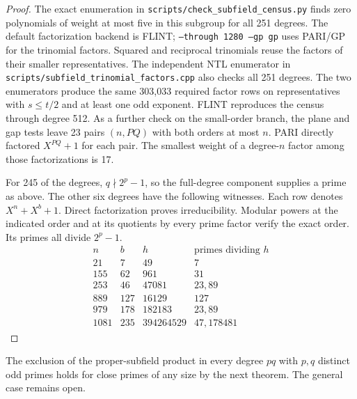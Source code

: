 \documentclass[11pt]{article}
\begin{document}
\begin{proof}
The exact enumeration in \nolinkurl{scripts/check_subfield_census.py}
finds zero polynomials of weight at most five in this subgroup for
all 251 degrees. The default factorization backend is FLINT;
\texttt{--through 1280 --gp gp} uses PARI/GP for the trinomial
factors. Squared and reciprocal trinomials reuse the factors of
their smaller representatives. The independent NTL enumerator in
\nolinkurl{scripts/subfield_trinomial_factors.cpp} also checks
all 251 degrees. The two enumerators produce the same 303,033
required factor rows on representatives with \(s\le t/2\) and
at least one odd exponent. FLINT reproduces the census through
degree 512. As a further check on the small-order branch, the plane
and gap tests leave 23 pairs \((n,PQ)\) with both orders at most \(n\).
PARI directly factored \(X^{PQ}+1\) for each pair. The smallest
weight of a degree-\(n\) factor among those factorizations is 17.

For 245 of the degrees, \(q\nmid 2^p-1\), so the full-degree
component supplies a prime as above. The other six degrees have the
following witnesses. Each row denotes \(X^n+X^b+1\). Direct
factorization proves irreducibility. Modular powers at the indicated
order and at its quotients by every prime factor verify the exact
order. Its primes all divide \(2^p-1\).
\[
\begin{array}{r|r|r|l}
 n & b & h & \text{primes dividing }h\\ \hline
 21 & 7 &49&7\\
 155&62&961&31\\
 253&46&47081&23,89\\
 889&127&16129&127\\
 979&178&182183&23,89\\
 1081&235&394264529&47,178481
\end{array}
\]
\end{proof}

The exclusion of the proper-subfield product in every degree \(pq\)
with \(p,q\) distinct odd primes holds for close primes of any size by the next theorem.
The general case remains open.
\end{document}
